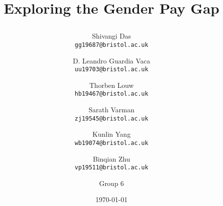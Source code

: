 \documentclass[a4, 11pt]{article}
\title{\vspace{-5em} {\Huge  Exploring the Gender Pay Gap }
\author{
 Shivangi Das\\
 \small{ \texttt{gg19687@bristol.ac.uk}}
  \and
 D. Leandro Guardia Vaca\\
  \small{\texttt{uu19703@bristol.ac.uk}}
 \and
 Thorben Louw\\
\small{\texttt{hb19467@bristol.ac.uk}}
  \and
 Sarath Varman\\
 \small{ \texttt{zj19545@bristol.ac.uk}}
 \and
 Kunlin Yang\\
  \small{\texttt{wb19074@bristol.ac.uk}}
 \and
 Binqian Zhu\\
  \small{\texttt{vp19511@bristol.ac.uk}}
 \and Group 6
}}
\date{\today}
\begin{document}
    
        \maketitle
        
    

    \thispagestyle{fancy}
  \begin{multicols}{2}

       
    
    
    
    

\renewcommand*{\bibfont}{\footnotesize}
\printbibliography
\end{multicols}

\begin{appendices}
    
\end{appendices}
\end{document}
